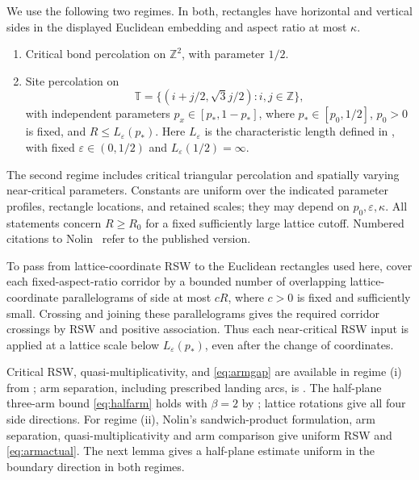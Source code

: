 \documentclass[11pt]{amsart}
\theoremstyle{remark}
\begin{document}
We use the following two regimes. In both, rectangles have horizontal and vertical sides in the displayed Euclidean embedding and aspect ratio at most $\kappa$.
\begin{enumerate}[label=(\roman*)]
\item Critical bond percolation on $\mathbb Z^2$, with parameter $1/2$.
\item Site percolation on
\[
 \mathbb T=\{(i+j/2,\sqrt3j/2):i,j\in\mathbb Z\},
\]
with independent parameters $p_x\in[p_*,1-p_*]$, where $p_*\in[p_0,1/2]$, $p_0>0$ is fixed, and $R\le L_\varepsilon(p_*)$. Here $L_\varepsilon$ is the characteristic length defined in \cite[Section~3.1]{Nolin}, with fixed $\varepsilon\in(0,1/2)$ and $L_\varepsilon(1/2)=\infty$.
\end{enumerate}
The second regime includes critical triangular percolation and spatially varying near-critical parameters. Constants are uniform over the indicated parameter profiles, rectangle locations, and retained scales; they may depend on $p_0,\varepsilon,\kappa$. All statements concern $R\ge R_0$ for a fixed sufficiently large lattice cutoff. Numbered citations to Nolin~\cite{Nolin} refer to the published version.

To pass from lattice-coordinate RSW to the Euclidean rectangles used here, cover each fixed-aspect-ratio corridor by a bounded number of overlapping lattice-coordinate parallelograms of side at most $cR$, where $c>0$ is fixed and sufficiently small. Crossing and joining these parallelograms gives the required corridor crossings by RSW and positive association. Thus each near-critical RSW input is applied at a lattice scale below $L_\varepsilon(p_*)$, even after the change of coordinates.

Critical RSW, quasi-multiplicativity, and \eqref{eq:armgap} are available in regime (i) from \cite[Section~2.2]{GPS}; arm separation, including prescribed landing arcs, is \cite[Appendix, Lemma~A.2 and Remark~A.7]{SS}. The half-plane three-arm bound \eqref{eq:halfarm} holds with $\beta=2$ by \cite[equation~(4.12)]{GPS}; lattice rotations give all four side directions. For regime (ii), Nolin's sandwich-product formulation, arm separation, quasi-multiplicativity and arm comparison \cite[Definition~5, Theorems~11 and~27, Proposition~17]{Nolin} give uniform RSW and \eqref{eq:armactual}. The next lemma gives a half-plane estimate uniform in the boundary direction in both regimes.
\end{document}
